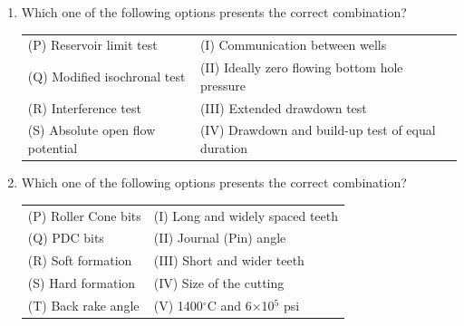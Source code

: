 \documentclass[12pt,a4paper]{article}
\begin{document}
\begin{enumerate}
\begin{enumerate}
\end{enumerate}

\pagebreak

\item Which one of the following options presents the correct combination? \hfill{}
\vspace{0.3cm}

\begin{tabular}{ll}
(P) Reservoir limit test         & (I) Communication between wells \\
(Q) Modified isochronal test     & (II) Ideally zero flowing bottom hole pressure \\
(R) Interference test            & (III) Extended drawdown test \\
(S) Absolute open flow potential & (IV) Drawdown and build-up test of equal duration\\ 
\end{tabular}


\begin{enumerate}
\end{enumerate}

\item Which one of the following options presents the correct combination? \hfill{}\vspace{0.3cm}

\begin{tabular}{ll}
(P) Roller Cone bits    & (I) Long and widely spaced teeth \\
(Q) PDC bits            & (II) Journal (Pin) angle \\
(R) Soft formation      & (III) Short and wider teeth \\
(S) Hard formation      & (IV) Size of the cutting \\
(T) Back rake angle     & (V) 1400$^\circ$C and 6$\times$10$^5$ psi \\
\end{tabular}




\end{enumerate}
\end{document}
